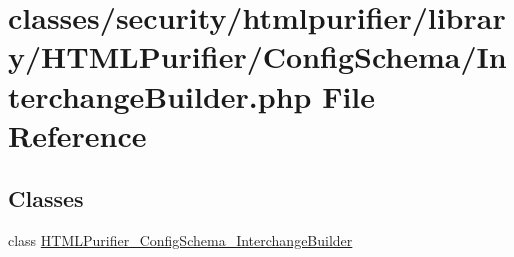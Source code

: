 \hypertarget{InterchangeBuilder_8php}{\section{classes/security/htmlpurifier/library/\+H\+T\+M\+L\+Purifier/\+Config\+Schema/\+Interchange\+Builder.php File Reference}
\label{InterchangeBuilder_8php}
}
\subsection*{Classes}
\begin{DoxyCompactItemize}
\item 
class \hyperlink{classHTMLPurifier__ConfigSchema__InterchangeBuilder}{H\+T\+M\+L\+Purifier\+\_\+\+Config\+Schema\+\_\+\+Interchange\+Builder}
\end{DoxyCompactItemize}
